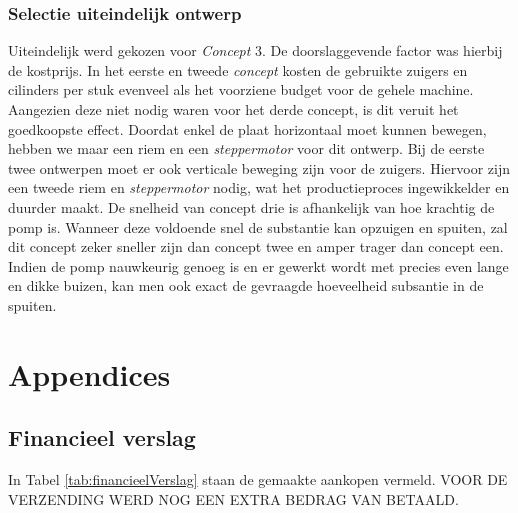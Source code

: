 \documentclass[a4paper,twoside,kulak]{kulakreport} %
\begin{document}
\subsection{Selectie uiteindelijk ontwerp}
Uiteindelijk werd gekozen voor \textit{Concept} 3. De doorslaggevende factor was hierbij de kostprijs. In het eerste en tweede \textit{concept} kosten de gebruikte zuigers en cilinders per stuk evenveel als het voorziene budget voor de gehele machine. Aangezien deze niet nodig waren voor het derde concept, is dit veruit het goedkoopste effect. Doordat enkel de plaat horizontaal moet kunnen bewegen, hebben we maar een riem en een \textit{steppermotor} voor dit ontwerp. Bij de eerste twee ontwerpen moet er ook verticale beweging zijn voor de zuigers. Hiervoor zijn een tweede riem en \textit{steppermotor} nodig, wat het productieproces ingewikkelder en duurder maakt. De snelheid van concept drie is afhankelijk van hoe krachtig de pomp is. Wanneer deze voldoende snel de substantie kan opzuigen en spuiten, zal dit concept zeker sneller zijn dan concept twee en amper trager dan concept een. Indien de pomp nauwkeurig genoeg is en er gewerkt wordt met precies even lange en dikke buizen, kan men ook exact de gevraagde hoeveelheid subsantie in de  spuiten. 





\chapter*{Appendices}
\section*{Financieel verslag}

In Tabel \ref{tab:financieelVerslag} staan de gemaakte aankopen vermeld. VOOR DE VERZENDING WERD NOG EEN EXTRA BEDRAG VAN    BETAALD.
\end{document}
